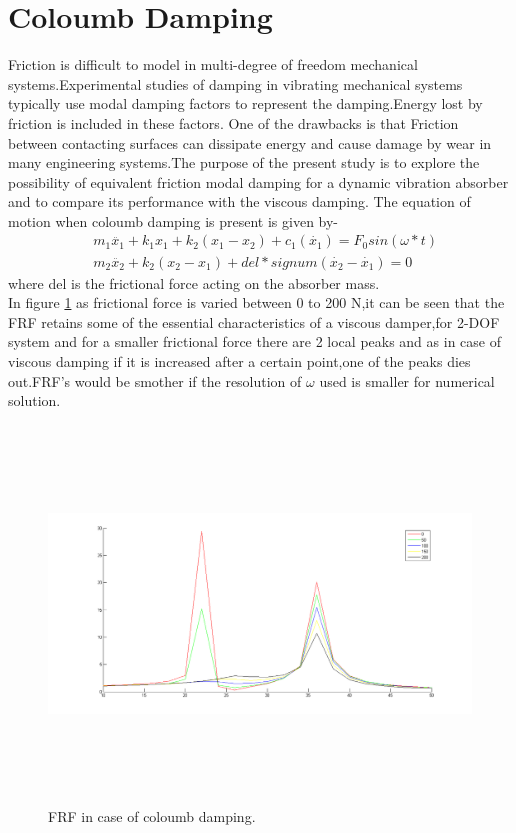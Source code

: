 %
\section{Coloumb Damping}
Friction is difficult to model in multi-degree of freedom mechanical systems.Experimental studies of damping in vibrating mechanical systems typically use modal damping factors to represent the damping.Energy lost by friction is included in these factors.
One of the drawbacks is that Friction between contacting surfaces can dissipate energy and cause damage by wear in
many engineering systems.The purpose of the present study is to explore the possibility of equivalent friction modal damping for a dynamic vibration absorber and to compare its performance with the viscous damping.
The equation of motion when coloumb damping is present is given by-
\begin{align}
&m_1\ddot{x_1}+k_1x_1+k_2(x_1-x_2)+c_1(\dot{x_1}) =F_0sin(\omega *t) \\
&m_2\ddot{x_2}+k_2(x_2-x_1)+del*signum(\dot{x_2} -\dot{x_1})=0
\end{align}
where del is the frictional force acting on the absorber mass.\\
In figure \ref{fig:25} as frictional force is varied between 0 to 200 N,it can be seen that the FRF retains some of the essential characteristics of a viscous damper,for 2-DOF system and for a smaller frictional force there are 2 local peaks and as in case of viscous damping if it is increased after a certain point,one of the peaks dies out.FRF's would be smother if the resolution of $\omega$ used is smaller for numerical solution.
\begin{figure}[h!]
\includegraphics[width=16cm,height=10cm]{"figures/25"}
  \caption{FRF in case of coloumb damping.}
  \label{fig:25}
  \end{figure}
  
